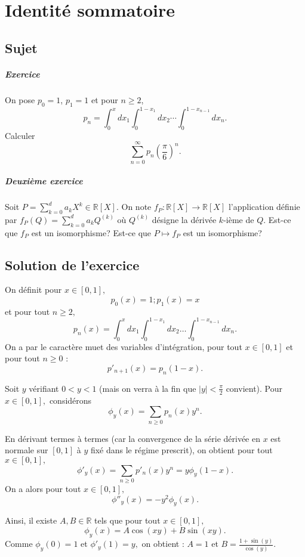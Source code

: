 \chapter{Identité sommatoire}

\section{Sujet}

\paragraph{Exercice}
On pose $p_{0}=1$, $p_{1} = 1$ et pour $n\geqslant 2$,
\[
p_{n}=\int_{0}^{x}dx_{1}\int_{0}^{1-x_{1}}dx_{2}\cdots\int_{0}^{1-x_{n-1}}dx_{n}.
\]
Calculer
\[
\sum_{n=0}^\infty p_n \left(\frac\pi6\right)^n.
\]
\paragraph{ Deuxième exercice}
Soit $P =\sum _{k=0}^d a_kX^k \in \mathbb R[X]. $ On note $f_P : \mathbb R[X] \to \mathbb R[X]$ l'application définie par $f_P(Q) = \sum_{k=0}^d a_k Q^{(k)}$ où $Q^{(k)}$ désigne la dérivée $k$-ième de $Q$.
Est-ce que $f_P$ est un isomorphisme? Est-ce que $ P\longmapsto f_P$ est un isomorphisme?
\section{Solution de l'exercice}

On définit pour $x\in[0,1],$ $$p_{0}(x)=1;p_{1}(x)=x$$et pour tout $n\geq 2,$ $$p_{n}(x)=\int_{0}^{x}dx_{1}\int_{0}^{1-x_{1}}dx_{2}\ldots\int_{0}^{1-x_{n-1}}dx_{n}.$$
On a par le caractère muet des variables d'intégration, pour tout $x\in[0,1]$ et pour tout $n\geq 0$ : $$p'_{n+1}(x)=p_{n}(1-x).$$

Soit $y$ vérifiant $0<y<1$ (mais on verra à la fin que $\vert y\vert <\frac{\pi}{2}$ convient).
Pour $x\in[0,1],$ considérons $$\phi_{y}(x)=\sum_{n\geq 0}p_{n}(x)y^{n}.$$

En dérivant termes à termes (car la convergence de la série dérivée en $x$ est normale sur $[0,1]$ à $y$ fixé dans le régime prescrit), 
on obtient pour tout $x\in[0,1],$ $$\phi'_{y}(x)=\sum_{n\geq 0}p'_{n}(x)y^{n}=y\phi_{y}(1-x).$$
On a alors pour tout $x\in[0,1],$ $$ \phi''_{y}(x)=-y^{2}\phi_{y}(x).$$

Ainsi, il existe $A,B\in\mathbb{R}$ tels que pour tout $x\in[0,1],$ $$ \phi_{y}(x)=A\cos(xy)+B\sin(xy).$$
Comme $\phi_{y}(0)=1$ et $\phi'_{y}(1)=y,$ on obtient : $A=1$ et $\displaystyle B=\frac{1+\sin(y)}{\cos(y)}.$

